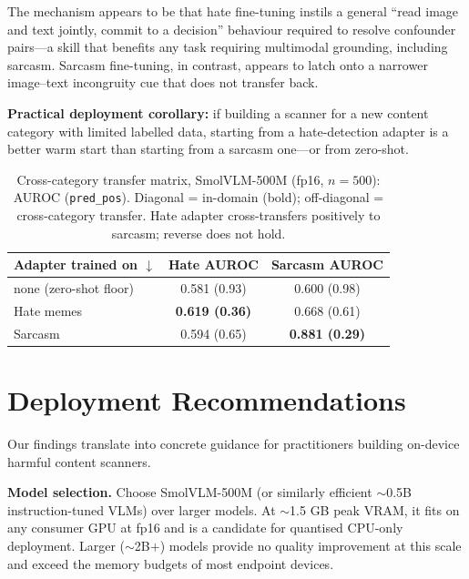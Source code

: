 \documentclass[sigconf,nonacm]{acmart}
\begin{document}
The mechanism appears to be that hate fine-tuning instils a general
``read image and text jointly, commit to a decision'' behaviour required to resolve
confounder pairs---a skill that benefits any task requiring multimodal grounding, including
sarcasm. Sarcasm fine-tuning, in contrast, appears to latch onto a narrower
image--text incongruity cue that does not transfer back.

\textbf{Practical deployment corollary:} if building a scanner for a new content
category with limited labelled data, starting from a hate-detection adapter is a better
warm start than starting from a sarcasm one---or from zero-shot.

\begin{table}[t]
\centering
\caption{Cross-category transfer matrix, SmolVLM-500M (fp16, $n{=}500$): AUROC
(\texttt{pred\_pos}). Diagonal = in-domain (bold); off-diagonal = cross-category transfer.
Hate adapter cross-transfers positively to sarcasm; reverse does not hold.}
\label{tab:matrix}
\begin{tabular}{lcc}
\toprule
\textbf{Adapter trained on} $\downarrow$ & Hate AUROC & Sarcasm AUROC \\
\midrule
none (zero-shot floor) & 0.581 (0.93) & 0.600 (0.98) \\
Hate memes             & \textbf{0.619 (0.36)} & 0.668 (0.61) \\
Sarcasm                & 0.594 (0.65) & \textbf{0.881 (0.29)} \\
\bottomrule
\end{tabular}
\end{table}

\section{Deployment Recommendations}\label{sec:recs}
Our findings translate into concrete guidance for practitioners building on-device harmful
content scanners.

\noindent\textbf{Model selection.} Choose SmolVLM-500M (or similarly efficient $\sim$0.5B
instruction-tuned VLMs) over larger models. At $\sim$1.5 GB peak VRAM, it fits on any
consumer GPU at fp16 and is a candidate for quantised CPU-only deployment. Larger
($\sim$2B$+$) models provide no quality improvement at this scale and exceed the memory
budgets of most endpoint devices.
\end{document}
